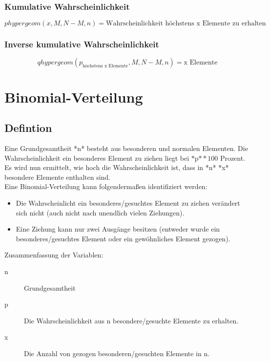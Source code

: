 \documentclass[a4paper,10pt]{article}
\begin{document}
\subsubsection{Kumulative Wahrscheinlichkeit}
\begin{equation}
  \label{eq:2}
  phypergeom(x, M, N - M, n) = \text{Wahrscheinlichkeit höchstens x Elemente zu erhalten}
\end{equation}

\subsubsection{Inverse kumulative Wahrscheinlichkeit}
\begin{equation}
  \label{eq:6}
  qhypergeom(p_{\text {höchstens x Elemente}}, M, N - M, n) = \text{x Elemente}
\end{equation}

\section{Binomial-Verteilung}
\subsection{Defintion}
Eine Grundgesamtheit *n* besteht aus besonderen und normalen
Elementen. Die Wahrscheinlichkeit ein besonderes Element zu ziehen
liegt bei $ \text{*p*} * 100 $ Prozent. Es wird nun ermittelt, wie
hoch die Wahrscheinlichkeit ist, dass in *n* *x* besondere Elemente
enthalten sind.
\\
Eine Binomial-Verteilung kann folgendermaßen identifiziert werden:
\begin{itemize}
\item Die Wahrscheinlicht ein besonderes/gesuchtes Element zu ziehen
  verändert sich nicht (auch nicht nach unendlich vielen Ziehungen).
\item Eine Ziehung kann nur zwei Ausgänge besitzen (entweder wurde ein
  besonderes/gesuchtes Element oder ein gewöhnliches Element gezogen).
\end{itemize}

Zusammenfassung der Variablen:
\begin{description}
\item[n] Grundgesamtheit
\item[p] Die Wahrscheinlichkeit aus n besondere/gesuchte Elemente zu
  erhalten.
\item[x] Die Anzahl von gezogen besonderen/gesuchten Elemente in n.
\end{description}
\end{document}

